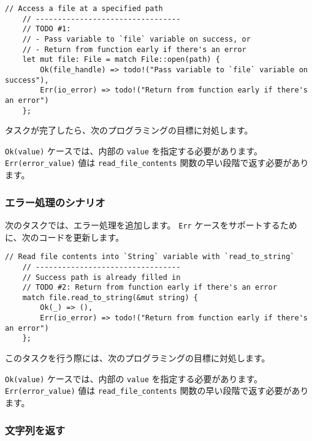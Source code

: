 \begin{lstlisting}[numbers=none]
    // Access a file at a specified path
    // ---------------------------------
    // TODO #1:
    // - Pass variable to `file` variable on success, or
    // - Return from function early if there's an error
    let mut file: File = match File::open(path) {
        Ok(file_handle) => todo!("Pass variable to `file` variable on success"),
        Err(io_error) => todo!("Return from function early if there's an error")
    };
\end{lstlisting}

タスクが完了したら、次のプログラミングの目標に対処します。

\begin{itemize}
\texttt{Ok(value)} ケースでは、内部の \texttt{value} を指定する必要があります。
\texttt{Err(error_value)} 値は \texttt{read\_file\_contents} 関数の早い段階で返す必要があります。
\end{itemize}

\subsubsection{エラー処理のシナリオ}

次のタスクでは、エラー処理を追加します。 \texttt{Err} ケースをサポートするために、次のコードを更新します。

\begin{lstlisting}[numbers=none]
    // Read file contents into `String` variable with `read_to_string`
    // ---------------------------------
    // Success path is already filled in
    // TODO #2: Return from function early if there's an error
    match file.read_to_string(&mut string) {
        Ok(_) => (),
        Err(io_error) => todo!("Return from function early if there's an error")
    };
\end{lstlisting}

このタスクを行う際には、次のプログラミングの目標に対処します。

\begin{itemize}
\texttt{Ok(value)} ケースでは、内部の \texttt{value} を指定する必要があります。
\texttt{Err(error_value)} 値は \texttt{read\_file\_contents} 関数の早い段階で返す必要があります。
\end{itemize}

\subsubsection{文字列を返す}

